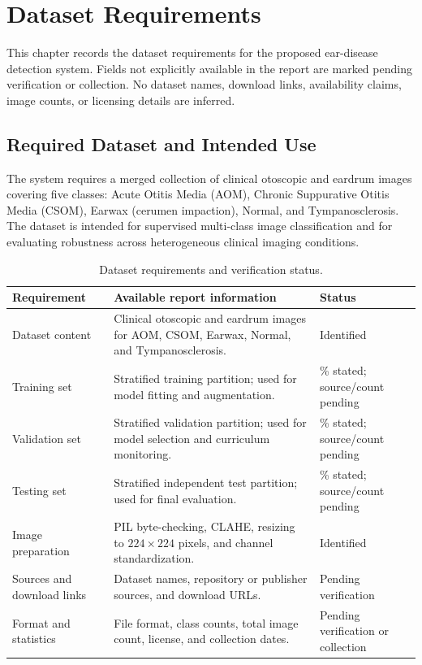 \documentclass[12pt,a4paper]{report}
\renewcommand{\textbf}[1]{#1}
\begin{document}
\chapter{Dataset Requirements}

This chapter records the dataset requirements for the proposed ear-disease detection system. Fields not explicitly available in the report are marked \textbf{pending verification or collection}. No dataset names, download links, availability claims, image counts, or licensing details are inferred.

\section{Required Dataset and Intended Use}
The system requires a merged collection of clinical otoscopic and eardrum images covering five classes: Acute Otitis Media (AOM), Chronic Suppurative Otitis Media (CSOM), Earwax (cerumen impaction), Normal, and Tympanosclerosis. The dataset is intended for supervised multi-class image classification and for evaluating robustness across heterogeneous clinical imaging conditions.

\begin{table}[H]
\centering
\caption{Dataset requirements and verification status.}
\label{tab:dataset_requirements}
\small
\renewcommand{\arraystretch}{1.25}
\begin{tabularx}{\textwidth}{>{\raggedright\arraybackslash}p{3.2cm} >{\raggedright\arraybackslash}X >{\raggedright\arraybackslash}p{3.4cm}}
\toprule
\textbf{Requirement} & \textbf{Available report information} & \textbf{Status}\\
\midrule
Dataset content & Clinical otoscopic and eardrum images for AOM, CSOM, Earwax, Normal, and Tympanosclerosis. & Identified\\
Training set & Stratified training partition; used for model fitting and augmentation. & 70\% stated; source/count pending\\
Validation set & Stratified validation partition; used for model selection and curriculum monitoring. & 15\% stated; source/count pending\\
Testing set & Stratified independent test partition; used for final evaluation. & 15\% stated; source/count pending\\
Image preparation & PIL byte-checking, CLAHE, resizing to $224\times224$ pixels, and channel standardization. & Identified\\
Sources and download links & Dataset names, repository or publisher sources, and download URLs. & Pending verification\\
Format and statistics & File format, class counts, total image count, license, and collection dates. & Pending verification or collection\\
\bottomrule
\end{tabularx}
\end{table}
\end{document}
